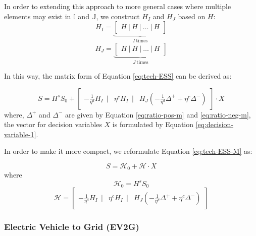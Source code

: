 In order to extending this approach to more general cases where multiple elements may exist in $\mathbb{I}$ and  $\mathbb{J}$, we construct $H_I$ and $H_J$ based on $H$:
\begin{equation*}
H_{I} = \underbrace{\begin{bmatrix}
	H~|~H~|~ \dots~|~H
	\end{bmatrix}}_{I~\text{times}}
\end{equation*}
\begin{equation*}
H_{J} = \underbrace{\begin{bmatrix}
	H~|~H~|~ \dots~|~H
	\end{bmatrix}}_{J~\text{times}}
\end{equation*}


In this way, the matrix form of Equation \eqref{eq:tech-ESS} can be derived as:

\begin{equation}
\label{eq:tech-ESS-M}
S = H^s S_0 + \begin{bmatrix}
-\frac{1}{\eta^d} H_I~~|& \eta^c H_I~~|& H_J (-\frac{1}{\eta^d} \Delta^{+} + \eta^c \Delta^{-})
\end{bmatrix} \cdot X
\end{equation}
where, $\Delta^{+}$ and $\Delta^{-}$ are given by Equation \eqref{eq:ratio-pos-m} and \eqref{eq:ratio-neg-m}, the vector for decision variables $X$ is formulated by Equation \eqref{eq:decision-variable-1}.


In order to make it more compact, we reformulate Equation \eqref{eq:tech-ESS-M} as:

\begin{equation}
\label{eq:state-ESS-M-1}
S = \mathcal{H}_0 + \mathcal{H} \cdot X
\end{equation}
where
\begin{equation}
\mathcal{H}_0 = H^s S_0 
\end{equation}
\begin{equation}
\label{eq:state-ESS-M-3}
\mathcal{H}  = \begin{bmatrix}
-\frac{1}{\eta^d} H_I~~|& \eta^c H_I~~|& H_J (-\frac{1}{\eta^d} \Delta^{+} + \eta^c \Delta^{-})
\end{bmatrix}
\end{equation}

\subsubsection{Electric Vehicle to Grid (EV2G)}

